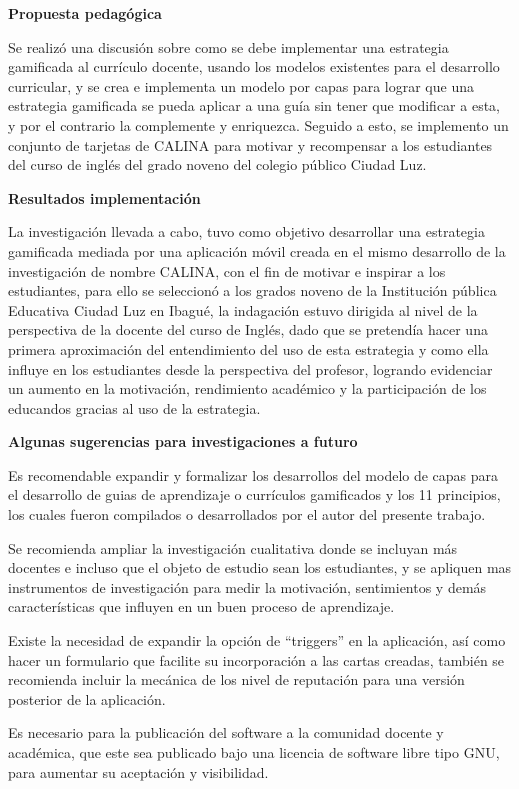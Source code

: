 \textbf{Propuesta pedagógica}

Se realizó una discusión sobre como se debe implementar una estrategia gamificada al currículo docente, usando 
los modelos existentes para el desarrollo curricular, y se crea e implementa un modelo por capas para lograr
que una estrategia gamificada se pueda aplicar a una guía sin tener que modificar a esta, y por el contrario
la complemente y enriquezca. Seguido a esto, se implemento un conjunto de tarjetas de CALINA para motivar y 
recompensar a los estudiantes del curso de inglés del grado noveno del colegio público Ciudad Luz.

\textbf{Resultados implementación}

La investigación llevada a cabo, tuvo como objetivo desarrollar una estrategia gamificada mediada por una 
aplicación móvil creada en el mismo desarrollo de la investigación de nombre CALINA, con el fin de motivar 
e inspirar a los estudiantes, para ello se seleccionó a los grados noveno de la Institución pública Educativa 
Ciudad Luz en Ibagué, la indagación estuvo dirigida al nivel de la perspectiva de la docente del curso de 
Inglés, dado que se pretendía hacer una primera aproximación del entendimiento del uso de esta estrategia y 
como ella influye en los estudiantes desde la perspectiva del profesor, logrando evidenciar un aumento en la
motivación, rendimiento académico y la participación de los educandos gracias al uso de la estrategia.

\textbf{Algunas sugerencias para investigaciones a futuro}

Es recomendable expandir y formalizar los desarrollos del modelo de capas para el desarrollo de guias de 
aprendizaje o currículos gamificados y los 11 principios, los cuales fueron compilados o desarrollados por el 
autor del presente trabajo.

Se recomienda ampliar la investigación cualitativa donde se incluyan más docentes e incluso que el objeto de
estudio sean los estudiantes, y se apliquen mas instrumentos de investigación para medir la motivación, 
sentimientos y demás características que influyen en un buen proceso de aprendizaje.

Existe la necesidad de expandir la opción de ``triggers'' en la aplicación, así como hacer un formulario que 
facilite su incorporación a las cartas creadas, también se recomienda incluir la mecánica de los nivel de 
reputación para una versión posterior de la aplicación.

Es necesario para la publicación del software a la comunidad docente y académica, que este sea publicado bajo 
una licencia de software libre tipo GNU, para aumentar su aceptación y visibilidad.

